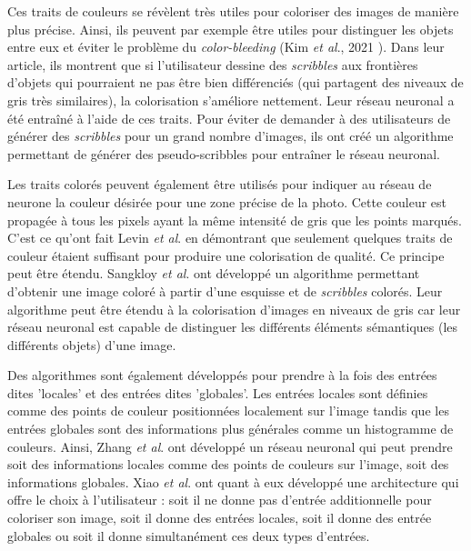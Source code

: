 \documentclass{article}
\begin{document}
Ces traits de couleurs se révèlent très utiles pour coloriser des images de manière plus précise.
Ainsi, ils peuvent par exemple être utiles pour distinguer les objets entre eux et éviter le problème du \textit{color-bleeding} (Kim \emph{et al}., 2021 \cite{color-Bleeding}).
Dans leur article, ils montrent que si l'utilisateur dessine des \textit{scribbles} aux frontières d'objets qui pourraient ne pas
être bien différenciés (qui partagent des niveaux de gris très similaires), la colorisation s'améliore nettement. Leur réseau neuronal a été entraîné à l'aide de ces traits.
Pour éviter de demander à des utilisateurs de générer des \textit{scribbles} pour un grand nombre d'images, ils ont créé un algorithme permettant de générer 
des pseudo-scribbles pour entraîner le réseau neuronal. %

Les traits colorés peuvent également être utilisés pour indiquer au réseau de neurone la couleur désirée pour une zone
précise de la photo. Cette couleur est propagée à tous les pixels ayant la même intensité de gris que les points marqués.
C'est ce qu'ont fait Levin \emph{et al}. \cite{10.1145/1015706.1015780} en démontrant que seulement quelques traits de couleur 
étaient suffisant pour produire une colorisation de qualité. Ce principe peut être étendu. Sangkloy \emph{et al}. \cite{journals/corr/SangkloyLFYH16} ont développé 
un algorithme permettant d'obtenir une image coloré à partir d'une esquisse et de \textit{scribbles} colorés. Leur algorithme
peut être étendu à la colorisation d'images en niveaux de gris car leur réseau neuronal est capable de distinguer les différents éléments sémantiques
(les différents objets) d'une image.

Des algorithmes sont également développés pour prendre à la fois des entrées dites 'locales' et des entrées dites 'globales'.
Les entrées locales sont définies comme des points de couleur positionnées localement sur l'image tandis que les entrées globales sont 
des informations plus générales comme un histogramme de couleurs.
Ainsi, Zhang \emph{et al}. \cite{ZhangZIGLYE17} ont développé un réseau neuronal qui peut prendre soit des informations locales comme des points de couleurs sur l'image,
soit des informations globales.
Xiao \emph{et al}. \cite{abs-1801-09083} ont quant à eux développé une architecture qui offre le choix à l'utilisateur : soit il ne donne pas d'entrée additionnelle pour coloriser
son image, soit il donne des entrées locales, soit il donne des entrée globales ou soit il donne simultanément ces deux types d'entrées.
\end{document}
